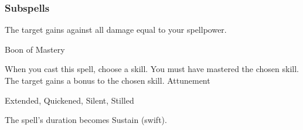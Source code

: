\subsubsection{Subspells}
The target gains  against all damage equal to your spellpower.
\begin{spellsection}{Boon of Mastery}
\begin{spellheader}
\end{spellheader}
\begin{spellcontent}
\begin{spelltargetinginfo}
\end{spelltargetinginfo}
\begin{spelleffects}
\spellspecial
When you cast this spell, choose a skill.
You must have mastered the chosen skill.
\spelleffect
The target gains a  bonus to the chosen skill.
\spelldur Attunement
\end{spelleffects}
\end{spellcontent}
\begin{spellfooter}
 Extended, Quickened, Silent, Stilled
\end{spellfooter}
\begin{spellsubcontent}
\begin{spellcantrip}
The spell's duration becomes Sustain (swift).
\end{spellcantrip}
\end{spellsubcontent}
\end{spellsection}
